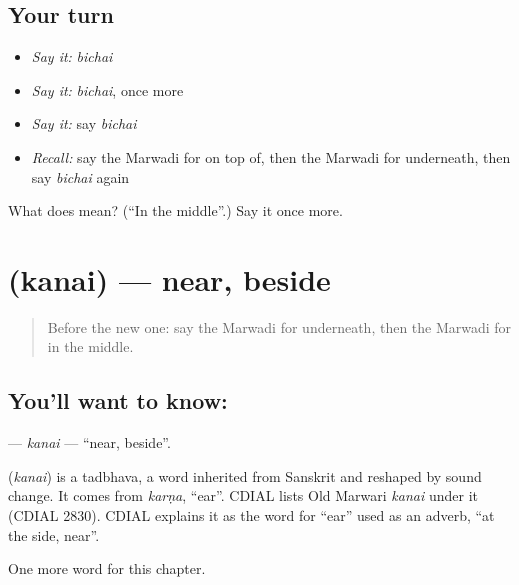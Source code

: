\subsection*{Your turn}
\begin{itemize}
\raggedright
  \item \emph{Say it:} \emph{bichai}
  \item \emph{Say it:} \emph{bichai}, once more
  \item \emph{Say it:} say \emph{bichai}
  \item \emph{Recall:} say the Marwadi for on top of, then the Marwadi for underneath, then say \emph{bichai} again
\end{itemize}

\begin{tcolorbox}[breakable,colback=teal!4,colframe=teal!35!black,title={Before you move on}]
What does  mean? (\textquotedblleft{}In the middle\textquotedblright{}.) Say it once more.
\end{tcolorbox}
\section[\texorpdfstring{\mw{कनै} (kanai)}{कनै (kanai)}]{ (kanai) — near, beside}

\label{lesson:MW-C97-kanai}



\begin{quote}
Before the new one: say the Marwadi for underneath, then the Marwadi for in the middle.
\end{quote}

\subsection*{You'll want to know: }
\textbf{} — \emph{kanai} — \textquotedblleft{}near, beside\textquotedblright{}.

\begin{cousinweb}
\textbf{} (\emph{kanai}) is a tadbhava, a word inherited from Sanskrit and reshaped by sound change. It comes from \emph{karṇa}, \textquotedblleft{}ear\textquotedblright{}. CDIAL lists Old Marwari \emph{kanai} under it (CDIAL 2830). CDIAL explains it as the word for \textquotedblleft{}ear\textquotedblright{} used as an adverb, \textquotedblleft{}at the side, near\textquotedblright{}.
\end{cousinweb}

\begin{grammarlens}[title={What you've built}]
One more word for this chapter.
\end{grammarlens}

